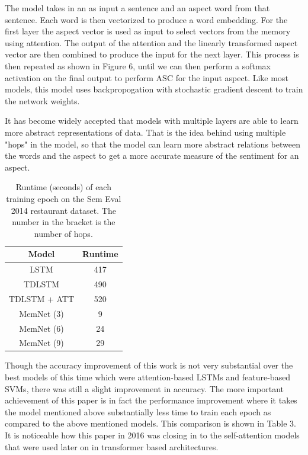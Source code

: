 \documentclass[conference]{IEEEtran}
\begin{document}
The model takes in an as input a sentence and an aspect word from that sentence. Each word is then vectorized to produce a word embedding. For the first layer the aspect vector is used as input to select vectors from the memory using attention. The output of the attention and the linearly transformed aspect vector are then combined to produce the input for the next layer. This process is then repeated as shown in Figure 6, until we can then perform a softmax activation on the final output to perform ASC for the input aspect. Like most models, this model uses backpropogation with stochastic gradient descent to train the network weights.

It has become widely accepted that models with multiple layers are able to learn more abstract representations of data. That is the idea behind using multiple "hops" in the model, so that the model can learn more abstract relations between the words and the aspect to get a more accurate measure of the sentiment for an aspect.

\begin{table}[htbp]
\caption{Runtime (seconds) of each training epoch on the Sem Eval 2014 restaurant dataset. The number in the bracket is the number of hops.}
\begin{center}
\begin{tabular}{|c|c|}
\hline
\textbf{Model} & \textbf{Runtime} \\
\hline
LSTM & 417 \\
TDLSTM & 490 \\
TDLSTM + ATT & 520 \\
\hline
MemNet (3) & 9 \\
MemNet (6) & 24 \\
MemNet (9) & 29 \\
\hline
\end{tabular}
\end{center}
\end{table}

Though the accuracy improvement of this work is not very substantial over the best models of this time which were attention-based LSTMs and feature-based SVMs, there was still a slight improvement in accuracy. The more important achievement of this paper is in fact the performance improvement where it takes the model mentioned above substantially less time to train each epoch as compared to the above mentioned models. This comparison is shown in Table 3. It is noticeable how this paper in 2016 was closing in to the self-attention models that were used later on in transformer based architectures.\\
\end{document}
